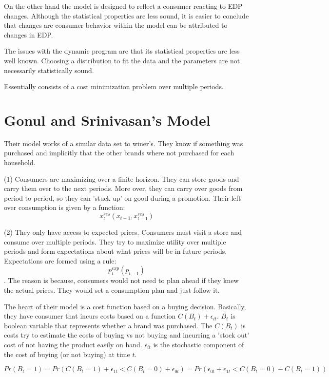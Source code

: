 \documentclass{article}
\begin{document}
On the other hand the model is designed to reflect a consumer reacting to EDP changes. Although the statistical properties are less sound, it is easier to conclude that changes are consumer behavior within the model can be attributed to changes in EDP.

The issues with the dynamic program are that its statistical properties are less well known. Choosing a distribution to fit the data and the parameters are not necessarily statistically sound.

Essentially consists of a cost minimization problem over multiple periods.



\section{Gonul and Srinivasan's Model}


Their model works of a similar data set to winer's. They know if something was purchased and implicitly that the other brands where not purchased for each household.

(1) Consumers are maximizing over a finite horizon. They can store goods and carry them over to the next periods. More over, they can carry over goods from period to period, so they can 'stuck up' on good during a promotion. Their left over consumption is given by a function: $$x^{res}_t(x_{t-1},x^{res}_{t-1})$$

(2) They only have access to expected prices. Consumers must visit a store and consume over multiple periods. They try to maximize utility over multiple periods and form expectations about what prices will be in future periods. Expectations are formed using a rule: $$p^{exp}_t(p_{t-1})$$. The reason is because, consumers would not need to plan ahead if they knew the actual prices. They would set a consumption plan and just follow it.

The heart of their model is a cost function based on a buying decision. Basically, they have consumer that incurs costs based on a function $C(B_t) + \epsilon_{it}$. $B_t$ is boolean variable that represents whether a brand was purchased. The $C(B_t)$ is costs try to estimate the costs of buying vs not buying and incurring a 'stock out' cost of not having the product easily on hand. $\epsilon_{it}$ is the stochastic component of the cost of buying (or not buying)
at time $t$.

$Pr(B_t=1) = Pr(C(B_t = 1) + \epsilon_{1t} < C(B_t = 0) + \epsilon_{0t} ) =  Pr(  \epsilon_{0t} + \epsilon_{1t} < C(B_t = 0) - C(B_t = 1) )   $
\end{document}
